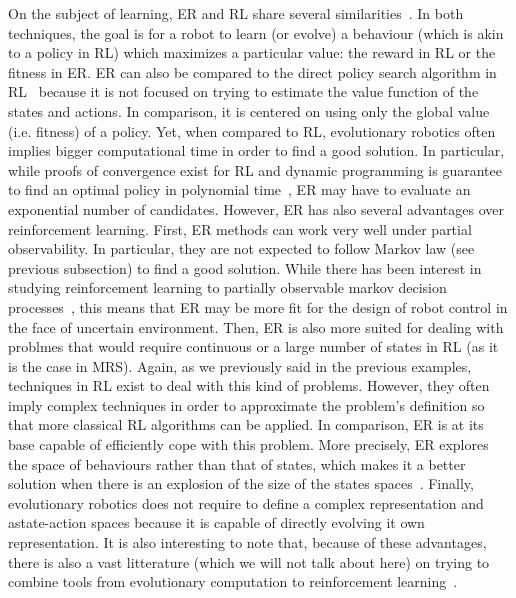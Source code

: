     On the subject of learning, ER and RL share several similarities~\cite{Whiteson2012, Doncieux2015a}. In both techniques, the goal is for a robot to learn (or evolve) a behaviour (which is akin to a policy in RL) which maximizes a particular value: the reward in RL or the fitness in ER. ER can also be compared to the direct policy search algorithm in RL~\cite{Kober2013} because it is not focused on trying to estimate the value function of the states and actions. In comparison, it is centered on using only the global value (i.e. fitness) of a policy. Yet, when compared to RL, evolutionary robotics often implies bigger computational time in order to find a good solution. In particular, while proofs of convergence exist for RL and dynamic programming is guarantee to find an optimal policy in polynomial time~\cite{Littman1994, Whiteson2012}, ER may have to evaluate an exponential number of candidates. However, ER has also several advantages over reinforcement learning. First, ER methods can work very well under partial observability. In particular, they are not expected to follow Markov law (see previous subsection) to find a good solution. While there has been interest in studying reinforcement learning to partially observable markov decision processes~\cite{Jaakkola1994}, this means that ER may be more fit for the design of robot control in the face of uncertain environment. Then, ER is also more suited for dealing with problmes that would require continuous or a large number of states in RL (as it is the case in MRS). Again, as we previously said in the previous examples, techniques in RL exist to deal with this kind of problems. However, they often imply complex techniques in order to approximate the problem's definition so that more classical RL algorithms can be applied. In comparison, ER is at its base capable of efficiently cope with this problem. More precisely, ER explores the space of behaviours rather than that of states, which makes it a better solution when there is an explosion of the size of the states spaces~\cite{Panait2005}. Finally, evolutionary robotics does not require to define a complex representation and astate-action spaces because it is capable of directly evolving it own representation. It is also interesting to note that, because of these advantages, there is also a vast litterature (which we will not talk about here) on trying to combine tools from evolutionary computation to reinforcement learning~\cite{Whiteson2012}.

